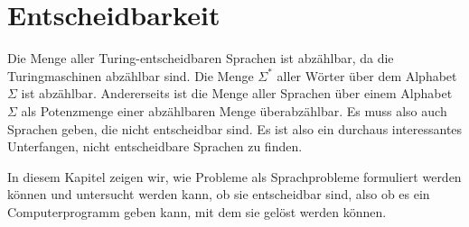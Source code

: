 %
%
\chapter{Entscheidbarkeit\label{chapter-entscheidbarkeit}}
\rhead{}
Die Menge aller Turing-entscheidbaren Sprachen ist abzählbar,
da die Turingmaschinen abzählbar sind.
Die Menge $\Sigma^*$ aller Wörter über dem Alphabet $\Sigma$ ist abzählbar.
Andererseits ist die Menge aller Sprachen über einem Alphabet $\Sigma$
als Potenzmenge einer abzählbaren Menge überabzählbar.
Es muss also auch Sprachen geben, die nicht entscheidbar sind.
Es ist also
ein durchaus interessantes Unterfangen, nicht entscheidbare Sprachen
zu finden.

In diesem Kapitel zeigen wir, wie Probleme als Sprachprobleme
formuliert werden können und untersucht werden kann, ob sie entscheidbar sind,
also ob es ein Computerprogramm geben kann, mit dem sie gelöst werden
können.







